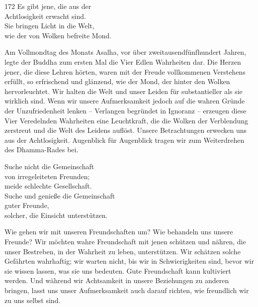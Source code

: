 
\begin{dhpVerse}{172}
\label{dhp-172}
Es gibt jene, die  aus der\\ 
Achtlosigkeit erwacht sind.\\ 
Sie bringen Licht in die Welt,\\ 
wie der von Wolken befreite Mond. 
\end{dhpVerse}

\begin{dhpRefl}

Am Vollmondtag des Monats Asalha, vor über zweitausendfünfhundert Jahren,
legte der Buddha zum ersten Mal die Vier Edlen Wahrheiten dar. Die Herzen
jener, die diese Lehren hörten, waren mit der Freude vollkommenen Verstehens
erfüllt, so erfrischend und glänzend, wie der Mond, der hinter den Wolken
hervorleuchtet. Wir halten die Welt und unser Leiden für substantieller als
sie wirklich sind. Wenn wir unsere Aufmerksamkeit jedoch auf die wahren Gründe
der Unzufriedenheit lenken -- Verlangen begründet in Ignoranz -- erzeugen
diese Vier Veredelnden Wahrheiten eine Leuchtkraft, die die Wolken der
Verblendung zerstreut und die Welt des Leidens auflöst. Unsere Betrachtungen
erwecken uns aus der Achtlosigkeit. Augenblick für Augenblick tragen wir zum
Weiterdrehen des Dhamma-Rades bei.

\end{dhpRefl}


\begin{dhpVerse}{78}
\label{dhp-78}
Suche nicht die Gemeinschaft\\ 
von irregeleiteten Freunden;\\ 
meide schlechte Gesellschaft.\\ 
Suche und genieße die Gemeinschaft\\ 
guter Freunde,\\ 
solcher, die Einsicht unterstützen. 
\end{dhpVerse}

\begin{dhpRefl}

Wie gehen wir mit unseren Freundschaften um? Wie behandeln uns unsere Freunde?
Wir möchten wahre Freundschaft mit jenen schützen und nähren, die unser
Bestreben, in der Wahrheit zu leben, unterstützen. Wir schätzen solche
Gefährten wahrhaftig; wir warten nicht, bis wir in Schwierigkeiten sind, bevor
wir sie wissen lassen, was sie uns bedeuten. Gute Freundschaft kann kultiviert
werden. Und während wir Achtsamkeit in unsere Beziehungen zu anderen bringen,
lasst uns unser Aufmerksamkeit auch darauf richten, wie freundlich wir zu uns
selbst sind.

\end{dhpRefl}

